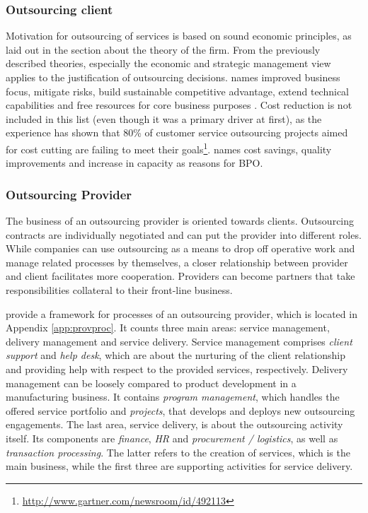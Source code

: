 		\subsubsection{Outsourcing client}
		Motivation for outsourcing of services is based on sound economic principles, as laid out in the section about the theory of the firm. From the previously described theories, especially the economic and strategic management view applies to the justification of outsourcing decisions. \citeauthor{bartell1998information} names improved business focus, mitigate risks, build sustainable competitive advantage, extend technical capabilities and free resources for core business purposes \citep{bartell1998information}. Cost reduction is not included in this list (even though it was a primary driver at first), as the experience has shown that 80\% of customer service outsourcing projects aimed for cost cutting are failing to meet their goals\footnote{\cf \url{http://www.gartner.com/newsroom/id/492113}}. \citeauthor{gross2006} names cost savings, quality improvements and increase in capacity \citep[]{gross2006} as reasons for \acrshort{BPO}. 
	
		\subsubsection{Outsourcing Provider}
		
		The business of an outsourcing provider is oriented towards clients. Outsourcing contracts are individually negotiated and can put the provider into different roles. While companies can use outsourcing as a means to drop off operative work and manage related processes by themselves, a closer relationship between provider and client facilitates more cooperation. Providers can become partners that take responsibilities collateral to their front-line business. 
		
		\cite{schewe2007} provide a framework for processes of an outsourcing provider, which is located in Appendix \ref{app:provproc}. It counts three main areas: service management, delivery management and service delivery. Service management comprises \textit{client support} and \textit{help desk}, which are about the nurturing of the client relationship and providing help with respect to the provided services, respectively. Delivery management can be loosely compared to product development in a manufacturing business. It contains \textit{program management}, which handles the offered service portfolio and \textit{projects}, that develops and deploys new outsourcing engagements. The last area, service delivery, is about the outsourcing activity itself. Its components are \textit{finance}, \textit{HR} and \textit{procurement / logistics}, as well as \textit{transaction processing}. The latter refers to the creation of services, which is the main business, while the first three are supporting activities for service delivery. 
			

